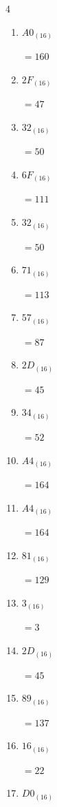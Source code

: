 \begin{multicols}{4}
\begin{enumerate}
  \item $A0_{(16)}$

        $=160$

  \item $2F_{(16)}$

        $=47$

  \item $32_{(16)}$

        $=50$

  \item $6F_{(16)}$

        $=111$

  \item $32_{(16)}$

        $=50$

  \item $71_{(16)}$

        $=113$

  \item $57_{(16)}$

        $=87$

\columnbreak %

  \item $2D_{(16)}$

        $=45$

  \item $34_{(16)}$

        $=52$

  \item $A4_{(16)}$

        $=164$

  \item $A4_{(16)}$

        $=164$

  \item $81_{(16)}$

        $=129$

  \item $3_{(16)}$

        $=3$

  \item $2D_{(16)}$

        $=45$

  \item $89_{(16)}$

        $=137$

  \item $16_{(16)}$

        $=22$

  \item $D0_{(16)}$


\end{enumerate}
\end{multicols}
